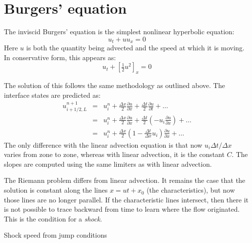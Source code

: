 
\begin{quote}
\end{quote}


\section{Burgers' equation}

The inviscid Burgers' equation is the simplest nonlinear hyperbolic
equation:
\begin{equation}
u_t + u u_x = 0
\end{equation}
Here $u$ is both the quantity being advected and the speed at which 
it is moving.
In conservative form, this appears as:
\begin{equation}
u_t + \left [\tfrac{1}{2} u^2 \right ]_x = 0
\end{equation}

The solution of this follows the same methodology as outlined above.
The interface states are predicted as:
\begin{eqnarray}
u^{n+1}_{i+1/2,L} &=& u^n_i + \frac{\Delta x}{2} \frac{\partial u}{\partial x}
                        + \frac{\Delta t}{2} \frac{\partial u}{\partial t} + \ldots \\
                &=& u^n_i + \frac{\Delta x}{2} \frac{\partial u}{\partial x}
                        + \frac{\Delta t}{2} \left (-u_i \frac{\partial u}{\partial x} \right ) + \ldots \\
                &=& u^n_i + \frac{\Delta x}{2} \left ( 1 - \frac{\Delta t}{\Delta x}u_i \right ) \frac{\partial u}{\partial x} + \ldots
\end{eqnarray}
The only difference with the linear advection equation is that now
$u_i \Delta t/\Delta x$ varies from zone to zone, whereas with linear
advection, it is the constant $C$.  The slopes are computed using
the same limiters as with linear advection.

The Riemann problem differs from linear advection.  It remains the
case that the solution is constant along the lines $x = ut + x_0$ (the
characteristics), but now those lines are no longer parallel.  If the
characteristic lines intersect, then there it is not possible to trace
backward from time to learn where the flow originated.  This is the 
condition for a {\em shock}.

Shock speed from jump conditions

